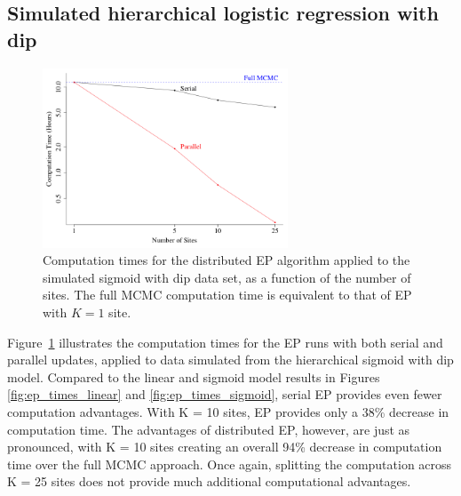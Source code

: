 \subsection{Simulated hierarchical logistic regression with dip}
\label{subsec:ep_results_logistic_dip}

\begin{figure}
\centering
   \includegraphics[width=0.65\textwidth]{figures/ep_sim/sigmoid_dip_times.png}
\caption{Computation times for the distributed EP algorithm applied to the simulated sigmoid with dip data set, as a function of the number of sites. The full MCMC computation time is equivalent to that of EP with $K=1$ site.}\label{fig:ep_times_sigmoid_dip}
\end{figure}

Figure~\ref{fig:ep_times_sigmoid_dip} illustrates the computation times for the EP runs with both serial and parallel updates, applied to data simulated from the hierarchical sigmoid with dip model. Compared to the linear and sigmoid model results in Figures \ref{fig:ep_times_linear} and \ref{fig:ep_times_sigmoid}, serial EP provides even fewer computation advantages. With K = 10 sites, EP provides only a 38\% decrease in computation time. The advantages of distributed EP, however, are just as pronounced, with K = 10 sites creating an overall 94\% decrease in computation time over the full MCMC approach. Once again, splitting the computation across K = 25 sites does not provide much additional computational advantages.

